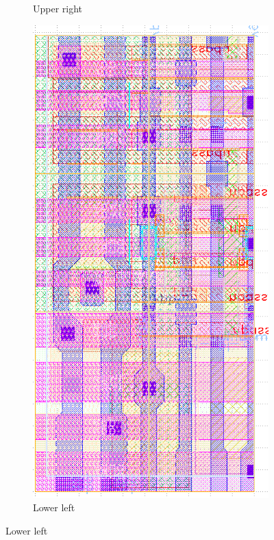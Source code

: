 \begin{figure}[H]
\begin{subfigure}[b]{0.22\textwidth}
\caption{Upper right}
\end{subfigure}
\hfill
\begin{subfigure}[b]{0.22\textwidth} \centering
\includegraphics[width=\textwidth]{figures/bitcell_ll.png}
\caption{Lower left}

\end{subfigure}
\end{figure}
